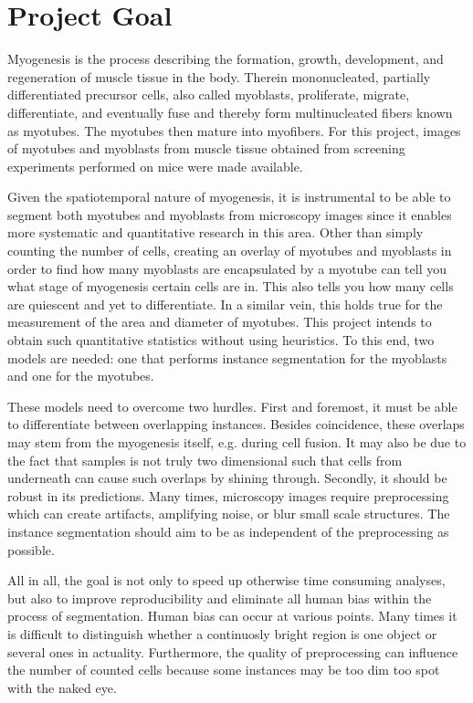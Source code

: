 \section{Project Goal}
Myogenesis is the process describing the formation, growth, development, and regeneration of muscle tissue in the body. Therein mononucleated, partially differentiated precursor cells, also called myoblasts, proliferate, migrate, differentiate, and eventually fuse and thereby form multinucleated fibers known as myotubes. The myotubes then mature into myofibers. For this project, images of myotubes and myoblasts from muscle tissue obtained from screening experiments performed on mice were made available.

Given the spatiotemporal nature of myogenesis, it is instrumental to be able to segment both myotubes and myoblasts from microscopy images since it enables more systematic and quantitative research in this area. Other than simply counting the number of cells, creating an overlay of myotubes and myoblasts in order to find how many myoblasts are encapsulated by a myotube can tell you what stage of myogenesis certain cells are in. This also tells you how many cells are quiescent and yet to differentiate. In a similar vein, this holds true for the measurement of the area and diameter of myotubes. This project intends to obtain such quantitative statistics without using heuristics. To this end, two models are needed: one that performs instance segmentation for the myoblasts and one for the myotubes. 

These models need to overcome two hurdles. First and foremost, it must be able to differentiate between overlapping instances. Besides coincidence, these overlaps may stem from the myogenesis itself, e.g. during cell fusion. It may also be due to the fact that samples is not truly two dimensional such that cells from underneath can cause such overlaps by shining through. Secondly, it should be robust in its predictions. Many times, microscopy images require preprocessing which can create artifacts, amplifying noise, or blur small scale structures. The instance segmentation should aim to be as independent of the preprocessing as possible.

All in all, the goal is not only to speed up otherwise time consuming analyses, but also to improve reproducibility and eliminate all human bias within the process of segmentation. Human bias can occur at various points. Many times it is difficult to distinguish whether a continuosly bright region is one object or several ones in actuality. Furthermore, the quality of preprocessing can influence the number of counted cells because some instances may be too dim too spot with the naked eye.
